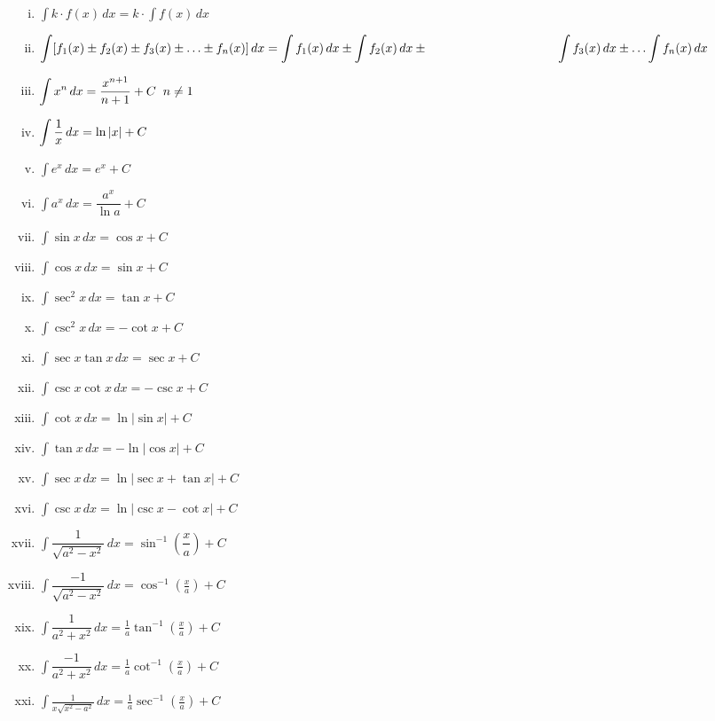 \documentclass{article}
\begin{document}
\begin{enumerate}[i.]
    \item $\displaystyle\int k\cdot f(x) \, dx = k \cdot \displaystyle\int f(x) \, dx$
    \item $\displaystyle\int [f_{1}(x)\pm f_{2}(x)\pm f_{3}(x)\pm \ldots \pm f_{n}(x)] \, dx= \displaystyle\int f_{1}(x) \, dx\pm \displaystyle\int f_{2}(x) \, dx\pm \hphantom{1cm}\hspace{3cm} \displaystyle\int f_{3}(x) \, dx \pm \ldots \displaystyle\int f_{n}(x) \, dx$
    \item $\displaystyle\int x^n \, dx=\dfrac{x^{n+1}}{n+1} +C \hfill \hspace{2mm} n \not=1$
    \item $\displaystyle\int \dfrac{1}{x} \, dx=\ln \abs{x} +C$
    \item $\displaystyle\int e^x \, dx=e^x +C$
    \item $\displaystyle\int a^x \, dx=\dfrac{a^x}{\ln a} +C$
    \item $\displaystyle\int \sin x \, dx=\cos x +C$
    \item $\displaystyle\int \cos x \, dx=\sin x +C$
    \item $\displaystyle\int \sec^2 x \, dx=\tan x +C$
    \item $\displaystyle\int \csc^2 x \, dx=-\cot x +C$
    \item $\displaystyle\int \sec x \tan x \, dx=\sec x +C$
    \item $\displaystyle\int \csc x \cot x \, dx=-\csc x +C $
    \item $\displaystyle\int \cot x \, dx=\ln |\sin x| +C$
    \item $\displaystyle\int \tan x \, dx=-\ln |\cos x| +C$
    \item $\displaystyle\int \sec x \, dx=\ln |\sec x + \tan x| +C$
    \item $\displaystyle\int \csc x \, dx=\ln |\csc x-\cot x| +C$
    \item $\displaystyle\int \dfrac{1}{\displaystyle\sqrt{a^2-x^2}} \, dx=\sin^{-1} \left(\dfrac{x}{a}\right) +C$
    \item $\displaystyle\int \dfrac{-1}{\displaystyle\sqrt{a^2-x^2}} \, dx=\cos^{-1} \left(\frac{x}{a}\right) +C$
    \item $\displaystyle\int \dfrac{1}{a^2+x^2} \, dx=\frac{1}{a} \tan^{-1}\left(\frac{x}{a}\right)+C$
    \item $\displaystyle\int \dfrac{-1}{a^2+x^2} \, dx=\frac{1}{a} \cot^{-1}\left(\frac{x}{a}\right)+C$
    \item $\displaystyle\int \frac{1}{x\displaystyle\sqrt{x^2-a^2}} \, dx=\frac{1}{a}\sec^{-1}\left(\frac{x}{a}\right)  +C$

\end{enumerate}
\end{document}
